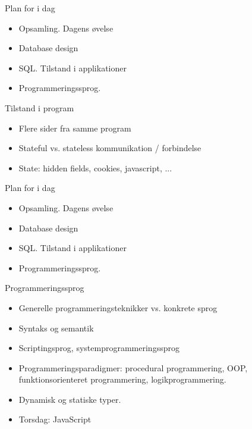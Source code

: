 \documentclass[a4paper,landscape]{slides}
\begin{document}
\begin{slide}
	\begin{center} {\large 
            Plan for i dag
	} \end{center}
	\begin{itemize} \addtolength{\itemsep}{-\baselineskip}
		\item Opsamling. Dagens øvelse
                \item Database design
                \item SQL. Tilstand i applikationer
                \item Programmeringssprog. 
	\end{itemize}
\end{slide}
\begin{slide}
	\begin{center} {\large 
            Tilstand i program
	} \end{center}
	\begin{itemize} \addtolength{\itemsep}{-\baselineskip}
            \item Flere sider fra samme program
            \item Stateful vs. stateless kommunikation / forbindelse
            \item State: hidden fields, cookies, javascript, ...
	\end{itemize}
\end{slide}

\begin{slide}
	\begin{center} {\large 
            Plan for i dag
	} \end{center}
	\begin{itemize} \addtolength{\itemsep}{-\baselineskip}
		\item Opsamling. Dagens øvelse
                \item Database design
                \item SQL. Tilstand i applikationer
                \item Programmeringssprog. 
	\end{itemize}
\end{slide}
\begin{slide}
	\begin{center} {\large 
            Programmeringssprog
	} \end{center}
	\begin{itemize} \addtolength{\itemsep}{-\baselineskip}
            \item Generelle programmeringsteknikker vs. konkrete sprog
            \item Syntaks og semantik
            \item Scriptingsprog, systemprogrammeringssprog
            \item Programmeringsparadigmer: procedural programmering, OOP, funktionsorienteret programmering, logikprogrammering.
            \item Dynamisk og statiske typer.
            \item Torsdag: JavaScript
	\end{itemize}
\end{slide}
\end{document}

